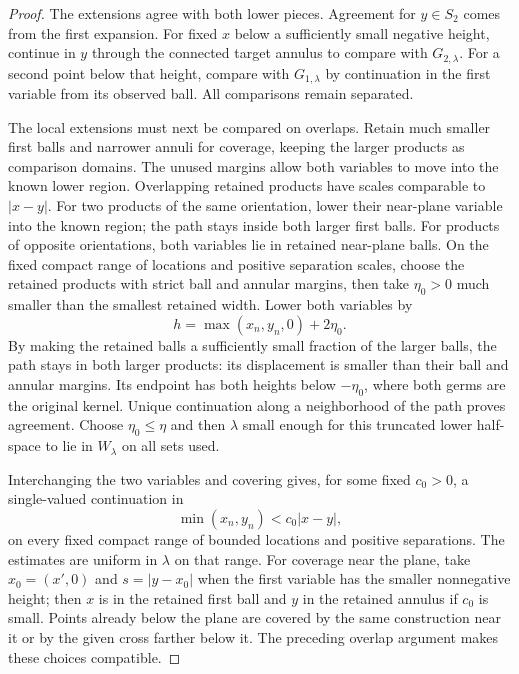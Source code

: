 \begin{proof}
The extensions agree with both lower pieces.  Agreement for $y\in S_2$
comes from the first expansion.  For fixed $x$ below a sufficiently
small negative height, continue in $y$ through the connected target
annulus to compare with $G_{2,\lambda}$.  For a second point below that
height, compare with $G_{1,\lambda}$ by continuation in the first
variable from its observed ball.  All comparisons remain separated.

The local extensions must next be compared on overlaps. Retain much
smaller first balls and narrower annuli for coverage, keeping the larger
products as comparison domains. The unused margins allow both variables
to move into the known lower region. Overlapping retained products have
scales comparable to $|x-y|$. For two products of the same orientation,
lower their near-plane variable into the known region; the path stays
inside both larger first balls.  For products of opposite orientations,
both variables lie in retained near-plane balls. On the fixed compact
range of locations and positive separation scales, choose the retained
products with strict ball and annular margins, then take $\eta_0>0$
much smaller than the smallest retained width. Lower both variables by
\[
 h=\max(x_n,y_n,0)+2\eta_0.
\]
By making the retained balls a sufficiently small fraction of the larger
balls, the path stays in both larger products: its displacement is
smaller than their ball and annular margins. Its endpoint has both
heights below $-\eta_0$,
where both germs are the original kernel.  Unique continuation along
a neighborhood of the path proves agreement.  Choose
$\eta_0\le\eta$ and then $\lambda$ small enough for this truncated
lower half-space to lie in $W_\lambda$ on all sets used.

Interchanging the two variables and covering gives, for some fixed
$c_0>0$, a single-valued continuation in
\begin{equation}\label{cross:coarse-region}
 \min(x_n,y_n)<c_0|x-y|,
\end{equation}
on every fixed compact range of bounded locations and positive
separations.  The estimates are uniform in $\lambda$ on that range.
For coverage near the plane, take $x_0=(x',0)$ and
$s=|y-x_0|$ when the first variable has the smaller nonnegative height;
then $x$ is in the retained first ball and $y$ in the retained annulus
if $c_0$ is small.  Points already below the plane are covered by the
same construction near it or by the given cross farther below it.
The preceding overlap argument makes these choices compatible.


\end{proof}
